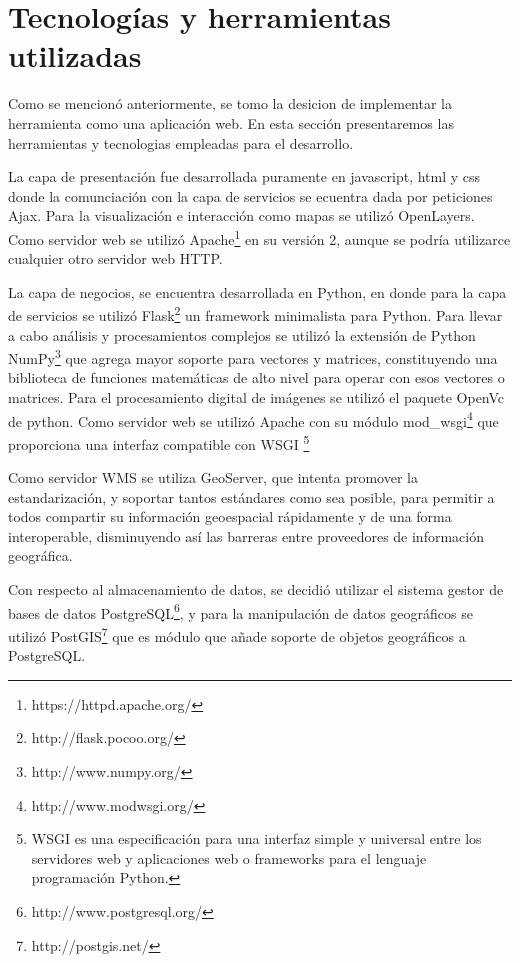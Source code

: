 \section{Tecnologías y herramientas utilizadas}
Como se mencionó anteriormente, se tomo la desicion de implementar la herramienta como una
aplicación web. En esta sección presentaremos las herramientas y tecnologias empleadas para el
desarrollo.

La capa de presentación fue desarrollada puramente en javascript, html y css donde la comunciación
con la capa de servicios se ecuentra dada por peticiones Ajax. Para la visualización e interacción
como mapas se utilizó OpenLayers. Como servidor web se utilizó
Apache\footnote{https://httpd.apache.org/} en su versión 2, aunque se podría utilizarce cualquier
otro servidor web HTTP.

La capa de negocios, se encuentra desarrollada en Python, en donde para la capa de servicios se
utilizó Flask\footnote{http://flask.pocoo.org/} un framework minimalista para Python. Para llevar
a cabo análisis y procesamientos complejos se utilizó la extensión de Python
NumPy\footnote{http://www.numpy.org/} que agrega mayor soporte para vectores y matrices,
constituyendo una biblioteca de funciones matemáticas de alto nivel para operar con esos vectores
o matrices. Para el procesamiento digital de imágenes se utilizó el paquete OpenVc de python. Como
servidor web se utilizó Apache con su módulo
mod\_wsgi\footnote{http://www.modwsgi.org/} que proporciona una interfaz compatible con
WSGI \footnote{WSGI es una especificación para una interfaz simple y universal entre los
servidores web y aplicaciones web o frameworks para el lenguaje programación Python.}

Como servidor WMS se utiliza GeoServer, que intenta promover la estandarización, y soportar tantos
estándares como sea posible, para permitir a todos compartir su información geoespacial
rápidamente y de una forma interoperable, disminuyendo así las barreras entre proveedores de
información geográfica.

Con respecto al almacenamiento de datos, se decidió utilizar el sistema gestor de bases de datos
PostgreSQL\footnote{http://www.postgresql.org/}, y para la manipulación de datos geográficos se utilizó PostGIS\footnote{http://postgis.net/} que es módulo que añade soporte de objetos
geográficos a PostgreSQL.

